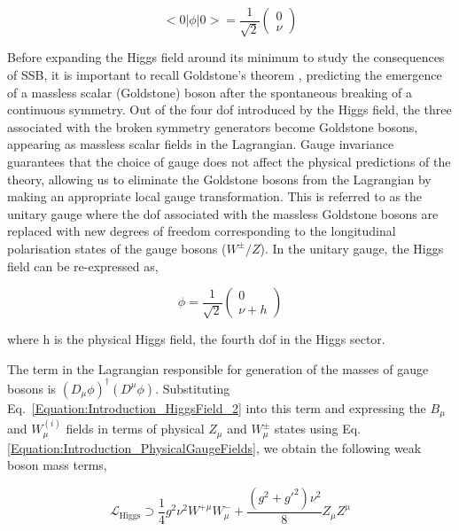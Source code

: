 \begin{equation}
    <0|\phi|0> = \frac{1}{\sqrt{2}} \begin{pmatrix}
        0 \\
        \nu
    \end{pmatrix}
\end{equation}
 
Before expanding the Higgs field around its minimum to study the consequences of SSB, it is important to recall Goldstone's theorem \cite{Goldstone}, predicting the emergence of a massless scalar (Goldstone) boson after the spontaneous breaking of a continuous symmetry. Out of the four dof introduced by the Higgs field, the three associated with the broken symmetry generators become Goldstone bosons, appearing as massless scalar fields in the Lagrangian. Gauge invariance guarantees that the choice of gauge does not affect the physical predictions of the theory, allowing us to eliminate the Goldstone bosons from the Lagrangian by making an appropriate local gauge transformation. This is referred to as the unitary gauge where the dof associated with the massless Goldstone bosons are replaced with new degrees of freedom corresponding to the longitudinal polarisation states of the gauge bosons ($W^{\pm}/Z$). In the unitary gauge, the Higgs field can be re-expressed as,

\begin{equation}
    \phi = \frac{1}{\sqrt{2}}\begin{pmatrix}
        0 \\
        \nu + h
    \end{pmatrix} 
    \label{Equation:Introduction_HiggsField_2}
\end{equation}

where h is the physical Higgs field, the fourth dof in the Higgs sector.

The term in the Lagrangian responsible for generation of the masses of gauge bosons is $(D_\mu\phi)^\dagger(D^\mu\phi)$. Substituting Eq.~\ref{Equation:Introduction_HiggsField_2} into this term and expressing the $B_\mu$ and $W_{\mu}^{(i)}$ fields in terms of physical $Z_\mu$ and $W_{\mu}^{\pm}$ states using Eq. \ref{Equation:Introduction_PhysicalGaugeFields}, we obtain the following weak boson mass terms,

\begin{equation}
    \mathcal{L}_{\text{Higgs}} \supset \frac{1}{4} g^2 \nu^2 W^{+\mu}W_{\mu}^- + \frac{(g^2+g'^2)\nu^2}{8} Z_\mu Z^\mu
\label{Equation:Introduction_HiggsLagrangian_2}
\end{equation}

